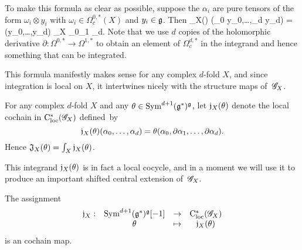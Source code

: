 \documentclass[10pt]{amsart}
\begin{document}
To make this formula as clear as possible, suppose the $\alpha_i$ are pure tensors of the form $\omega_i \otimes y_i$ with $\omega_i \in \Omega^{0,*}_c(X)$ and $y_i \in \mathfrak g$.
Then
\beqn\label{jthetafactored}
\fJ_X(\theta) (\omega_0 \tensor y_0,\ldots,\omega_{d} \tensor y_{d}) = \theta(y_0,\ldots,y_{d}) \int_X \omega_0\wedge \partial \omega_1 \cdots \wedge \partial \omega_{d}.
\eeqn
Note that we use $d$ copies of the holomorphic derivative $\partial: \Omega^{0,*} \to \Omega^{1,*}$ to obtain an element of $\Omega^{d,*}_c$ in the integrand and hence something that can be integrated.

This formula manifestly makes sense for any complex $d$-fold $X$, 
and since integration is local on $X$, 
it intertwines nicely with the structure maps of~$\mathscr G_X$.

\begin{dfn}
For any complex $d$-fold $X$ and any $\theta \in {\rm Sym}^{d+1}(\mathfrak g^*)^\mathfrak g$, 
let $\mathfrak j_X(\theta)$ denote the local cochain in ${\rm C}_{\rm loc}^*(\mathscr G_X)$ defined~by
\[
\mathfrak j_X(\theta)(\alpha_0 ,\ldots,\alpha_d) = \theta(\alpha_0,\partial \alpha_1,\ldots,\partial \alpha_d).
\]
Hence $\mathfrak J_X(\theta) = \int_X \mathfrak j_X(\theta)$.
\end{dfn}

This integrand $\mathfrak j_X(\theta)$ is in fact a local cocycle, and 
in a moment we will use it to produce an important shifted central extension of~$\mathscr G_X$.

\begin{prop}\label{prop j map} 
The assignment 
\[
\begin{array}{cccc}
\mathfrak j_X : & {\rm Sym}^{d+1} (\mathfrak g^*)^\mathfrak g [-1]  & \to & {\rm C}_{\rm loc}^*(\mathscr G_X) \\ 
& \theta &\mapsto & \mathfrak j_X(\theta)
\end{array}
\]
is an cochain map.
\end{prop}
\end{document}
